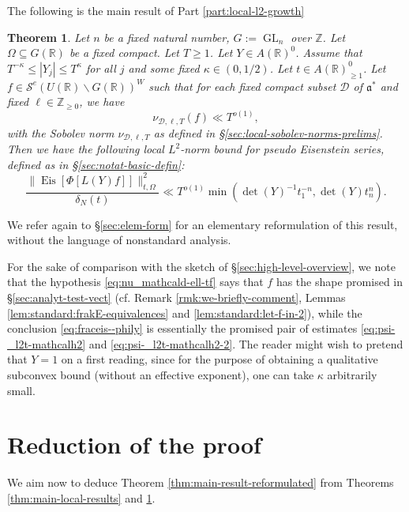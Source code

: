 \documentclass[reqno]{amsart}
\DeclareMathOperator{\GL}{GL}
\DeclareMathOperator{\Eis}{Eis}
\theoremstyle{plain} \newtheorem{theorem} {Theorem}
\theoremstyle{definition} \newtheorem{definition} [theorem] {Definition}
\theoremstyle{itplain} %
\numberwithin{equation}{section}
\numberwithin{theorem}{section}
\renewcommand{\geq}{\geqslant}
\renewcommand{\leq}{\leqslant}
\begin{document}
The following is the main result of Part \ref{part:local-l2-growth} 

\begin{theorem}\label{thm:growth-eisenstein-nonstandard}
  Let $n$ be a fixed natural number, $G := \GL_n$ over $\mathbb{Z}$.  Let $\Omega \subseteq G(\mathbb{R})$ be a fixed compact.  Let $T \geq 1$.  Let $Y \in A(\mathbb{R})^0$.  Assume that $T^{-\kappa} \leq |Y_j| \leq T^{\kappa}$ for all $j$ and some fixed $\kappa \in (0,1/2)$.  Let $t \in A(\mathbb{R})^0_{\geq 1}$.  Let $f \in \mathcal{S}^e(U(\mathbb{R}) \backslash G(\mathbb{R}))^W$ such that for each fixed compact subset $\mathcal{D}$ of $\mathfrak{a}^*$ and fixed $\ell \in \mathbb{Z}_{\geq 0}$, we have 
  \begin{equation}\label{eq:nu_mathcald-ell-tf}
    \nu_{\mathcal{D},\ell,T}(f) \ll T^{o(1)},
  \end{equation}
  with the Sobolev norm $\nu_{\mathcal{D},\ell,T}$ as defined in \S\ref{sec:local-sobolev-norms-prelims}.  Then we have the following local $L^2$-norm bound for pseudo Eisenstein series, defined as in \S\ref{sec:notat-basic-defin}:
  \begin{equation}\label{eq:fraceis--phily}
    \frac{\|\Eis [ \Phi[L(Y) f] ] \|_{t,\Omega}^2}{\delta_N(t)}
    \ll T^{o(1)} \min \left( \det(Y)^{-1} t_1^{-n}, \det(Y) t_n^n \right).
  \end{equation}
\end{theorem}
We refer again to \S\ref{sec:elem-form} for an elementary reformulation of this result, without the language of nonstandard analysis.

\begin{remark}
For the sake of comparison with the sketch of \S\ref{sec:high-level-overview}, we note that the hypothesis \eqref{eq:nu_mathcald-ell-tf} says that $f$ has the shape promised in \S\ref{sec:analyt-test-vect} (cf. Remark \ref{rmk:we-briefly-comment}, Lemmas \ref{lem:standard:frakE-equivalences} and \ref{lem:standard:let-f-in-2}), while the conclusion \eqref{eq:fraceis--phily} is essentially the promised pair of estimates \eqref{eq:psi-_l2t-mathcalh2} and \eqref{eq:psi-_l2t-mathcalh2-2}.  The reader might wish to pretend that $Y = 1$ on a first reading, since for the purpose of obtaining a qualitative subconvex bound (without an effective exponent), one can take $\kappa$ arbitrarily small.
\end{remark}

\section{Reduction of the proof}\label{sec:reduction-proof-0}
We aim now to deduce Theorem \ref{thm:main-result-reformulated} from Theorems \ref{thm:main-local-results} and \ref{thm:growth-eisenstein-nonstandard}.
\end{document}
